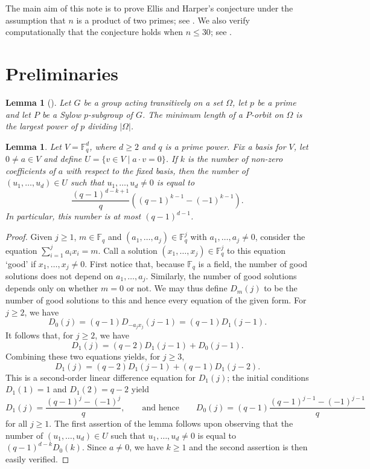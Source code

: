 \documentclass[11pt,a4paper]{amsart}
\newtheorem{lemma}[theorem]{Lemma}
\theoremstyle{definition}
\begin{document}
The main aim of this note is to prove Ellis and Harper's conjecture under the assumption that $n$ is a product of two primes; see . We also verify computationally that the conjecture holds when $ n \leq 30$; see . 


\section{Preliminaries}
\begin{lemma}[{\cite[Lemma 2.2]{friends}}]\label{friends}
Let $G$ be a group acting transitively on a set $\Omega$, let $p$ be a prime and let $P$ be a Sylow $p$-subgroup of $G$. The minimum length of a $P$-orbit on $\Omega$ is the largest power of $p$ dividing $|\Omega|$.
\end{lemma}



\begin{lemma}\label{DerangementsInPGroups1}
Let $V = \mathbb{F}_q^d$, where $d\geq 2$ and $q$ is a prime power. Fix a basis for $V$, let $0\neq a\in V$ and define $U=\{v\in V\mid a\cdot v=0\}$. If $k$ is the number of non-zero coefficients of $a$ with respect to the fixed basis, then the number of $(u_1,\dots,u_d) \in U$ such that $u_1,\dots,u_d \neq 0$ is  equal to
\[\frac{(q-1)^{d-k+1}}{q} \left( (q-1)^{k-1}-(-1)^{k-1} \right).
\] 
In particular, this number is at most $(q-1)^{d-1}$. 
\end{lemma}
\begin{proof}
Given $j\geq 1$, $m\in \mathbb{F}_q$ and $(a_1,\ldots,a_j)\in \mathbb{F}_q^j$ with $a_1,\dots,a_j \neq 0$, consider the equation $\sum_{i=1}^j a_ix_i=m$. Call a solution $(x_1, \dots, x_j) \in \mathbb{F}_q^j$ to this equation `good' if $x_1, \dots, x_j \neq 0$. First notice that, because $\mathbb{F}_q$ is a field, the number of good solutions does not depend on $a_1,\dots,a_j$. Similarly, the number of good solutions depends only on whether $m=0$ or not. We may thus define $D_m(j)$ to be the number of good solutions to this and hence every equation of the given form. For $j\geq 2$, we have 
\[
D_0(j) = (q-1)D_{-a_jx_j}(j-1) = (q-1)D_1(j-1).
\]
It follows that, for $j\geq 2$, we have
\[
D_1(j)  = (q-2)D_1(j-1)+ D_0(j-1). 
\]
Combining these two equations yields, for $j \geq 3$, 
\[
D_1(j) =  (q-2)D_1(j-1)+(q-1)D_1(j-2).
\]
This is a second-order linear difference equation for $D_1(j)$; the initial conditions  $D_1(1)=1$ and  $D_1(2)=q-2$ yield
\[
D_1(j) = \frac{(q-1)^{j}-(-1)^j}{q}, 
\qquad \text{and hence} \qquad
D_0(j) = (q-1)\frac{(q-1)^{j-1}-(-1)^{j-1}}{q}
\]
for all $j\geq 1$. The first assertion of the lemma follows upon observing that the number of  $(u_1,\dots,u_d)\in U$ such that  $u_1,\dots,u_d \neq 0$ is equal to $(q-1)^{d-k}D_0(k)$. Since $a\neq 0$, we have $k\geq 1$ and the second assertion is then easily verified. 
\end{proof}
\end{document}
